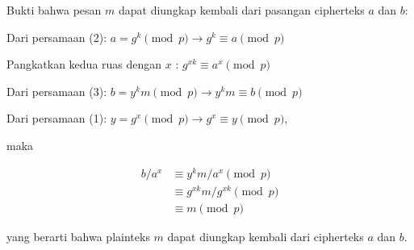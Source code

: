 \documentclass{article}
\begin{document}

Bukti bahwa pesan $m$ dapat diungkap kembali dari pasangan cipherteks $a$ dan $b$:

Dari persamaan (2): $a = g^k \pmod p \rightarrow g^k \equiv a \pmod p$

Pangkatkan kedua ruas dengan $x$ : $g^{xk} \equiv a^x \pmod p$

Dari persamaan (3): $b = y^k m \pmod p \rightarrow y^k m \equiv b \pmod p$

Dari persamaan (1): $y = g^x \pmod p \rightarrow g^x \equiv y \pmod p$,

maka

\begin{align*}
 b/a^x &\equiv y^k m / a^x \pmod p \\
 &\equiv g^{xk} m / g^{xk} \pmod p \\
 &\equiv m \pmod p
\end{align*}

yang berarti bahwa plainteks $m$ dapat diungkap kembali dari cipherteks $a$ dan $b$.
\end{document}
